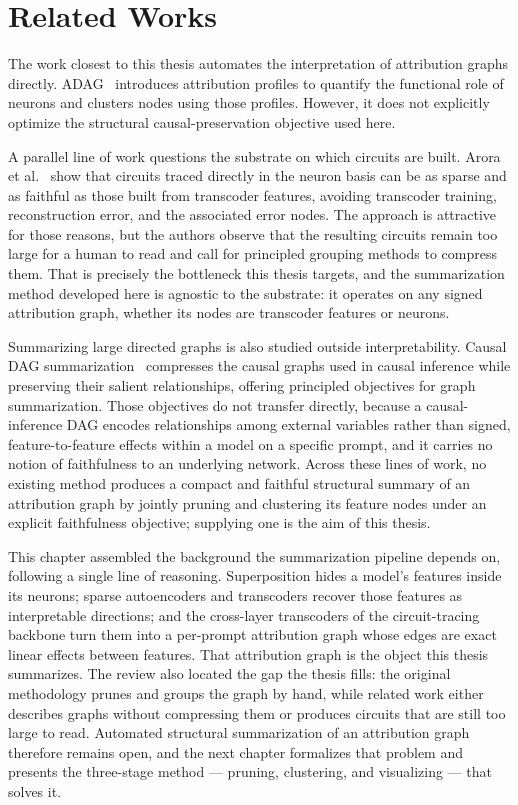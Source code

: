 \documentclass[../main.tex]{subfiles}
\begin{document}
\section{Related Works}
\label{sec:related}
The work closest to this thesis automates the interpretation of attribution graphs directly. ADAG~\cite{arora2026adag} introduces attribution profiles to quantify the functional role of neurons and clusters nodes using those profiles. However, it does not explicitly optimize the structural causal-preservation objective used here.

A parallel line of work questions the substrate on which circuits are built. Arora et al.~\cite{arora2026sparse} show that circuits traced directly in the neuron basis can be as sparse and as faithful as those built from transcoder features, avoiding transcoder training, reconstruction error, and the associated error nodes. The approach is attractive for those reasons, but the authors observe that the resulting circuits remain too large for a human to read and call for principled grouping methods to compress them. That is precisely the bottleneck this thesis targets, and the summarization method developed here is agnostic to the substrate: it operates on any signed attribution graph, whether its nodes are transcoder features or neurons.

Summarizing large directed graphs is also studied outside interpretability. Causal DAG summarization~\cite{youngmann2025causal} compresses the causal graphs used in causal inference while preserving their salient relationships, offering principled objectives for graph summarization. Those objectives do not transfer directly, because a causal-inference DAG encodes relationships among external variables rather than signed, feature-to-feature effects within a model on a specific prompt, and it carries no notion of faithfulness to an underlying network. Across these lines of work, no existing method produces a compact and faithful structural summary of an attribution graph by jointly pruning and clustering its feature nodes under an explicit faithfulness objective; supplying one is the aim of this thesis.

This chapter assembled the background the summarization pipeline depends on, following a single line of reasoning. Superposition hides a model's features inside its neurons; sparse autoencoders and transcoders recover those features as interpretable directions; and the cross-layer transcoders of the circuit-tracing backbone turn them into a per-prompt attribution graph whose edges are exact linear effects between features. That attribution graph is the object this thesis summarizes. The review also located the gap the thesis fills: the original methodology prunes and groups the graph by hand, while related work either describes graphs without compressing them or produces circuits that are still too large to read. Automated structural summarization of an attribution graph therefore remains open, and the next chapter formalizes that problem and presents the three-stage method --- pruning, clustering, and visualizing --- that solves it.
\end{document}
